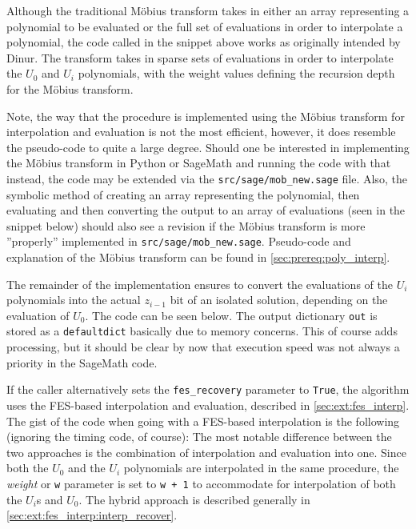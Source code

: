 Although the traditional Möbius transform takes in either an array representing a polynomial to be evaluated or the full set of evaluations in order to interpolate a polynomial, the code called in the snippet above works as originally intended by Dinur. The transform takes in sparse sets of evaluations in order to interpolate the $U_0$ and $U_i$ polynomials, with the weight values defining the recursion depth for the Möbius transform.

Note, the way that the procedure is implemented using the Möbius transform for interpolation and evaluation is not the most efficient, however, it does resemble the pseudo-code to quite a large degree. Should one be interested in implementing the Möbius transform in Python or SageMath and running the code with that instead, the code may be extended via the \texttt{src/sage/mob\_new.sage} file. Also, the symbolic method of creating an array representing the polynomial, then evaluating and then converting the output to an array of evaluations (seen in the snippet below)
should also see a revision if the Möbius transform is more ''properly'' implemented in \texttt{src/sage/mob\_new.sage}. Pseudo-code and explanation of the Möbius transform can be found in \cref{sec:prereq:poly_interp}.

The remainder of the implementation ensures to convert the evaluations of the $U_i$ polynomials into the actual $z_{i - 1}$ bit of an isolated solution, depending on the evaluation of $U_0$. The code can be seen below.
The output dictionary \texttt{out} is stored as a \texttt{defaultdict} basically due to memory concerns. This of course adds processing, but it should be clear by now that execution speed was not always a priority in the SageMath code.

If the caller alternatively sets the \texttt{fes\_recovery} parameter to \texttt{True}, the algorithm uses the FES-based interpolation and evaluation, described in \cref{sec:ext:fes_interp}. The gist of the code when going with a FES-based interpolation is the following (ignoring the timing code, of course):
The most notable difference between the two approaches is the combination of interpolation and evaluation into one. Since both the $U_0$ and the $U_i$ polynomials are interpolated in the same procedure, the \textit{weight} or \texttt{w} parameter is set to \texttt{w + 1} to accommodate for interpolation of both the $U_i$s and $U_0$. The hybrid approach is described generally in \cref{sec:ext:fes_interp:interp_recover}.

